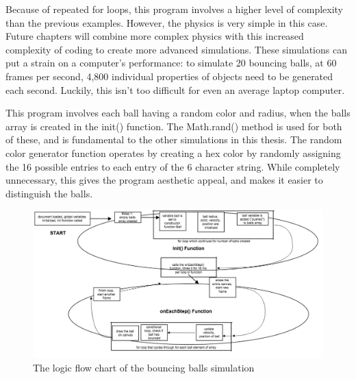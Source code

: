 Because of repeated for loops, this program involves a higher level of complexity than the previous examples.  However, the physics is very simple in this case.  Future chapters will combine more complex physics with this increased complexity of coding to create more advanced simulations.  These simulations can put a strain on a computer's performance: to simulate 20  bouncing balls, at 60 frames per second, 4,800 individual properties of objects need to be generated each second.  Luckily, this isn’t too difficult for even an average laptop computer.  

This program involves each ball having a random color and radius, when the balls array is created in the init() function.  The Math.rand() method is used for both of these, and is fundamental to the other simulations in this thesis.  The random color generator function operates by creating a hex color by randomly assigning the 16 possible entries to each entry of the 6 character string.  While completely unnecessary, this gives the program aesthetic appeal, and makes it easier to distinguish the balls.

\begin{figure}[t]  
  \centering
  \includegraphics[width=15cm]{Figures/ballsbouncing.png}
  \caption{The logic flow chart of the bouncing balls simulation}
  \label{blah}
\end{figure}





































